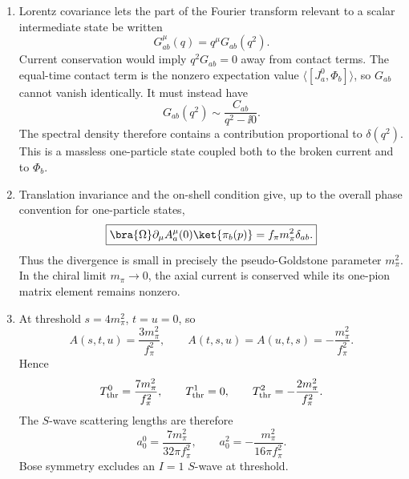\begin{enumerate}
  \begin{enumerate}
    \item[(a)]
    Lorentz covariance lets the part of the Fourier transform relevant to
    a scalar intermediate state be written
    \[
      G^\mu_{ab}(q)=q^\mu G_{ab}(q^2).
    \]
    Current conservation would imply \(q^2G_{ab}=0\) away from contact
    terms.  The equal-time contact term is the nonzero expectation value
    \(\langle[J^0_a,\Phi_b]\rangle\), so \(G_{ab}\) cannot vanish
    identically.  It must instead have
    \[
      G_{ab}(q^2)\sim\frac{C_{ab}}{q^2-\ii0}.
    \]
    The spectral density therefore contains a contribution proportional to
    \(\delta(q^2)\).  This is a massless one-particle state coupled both to
    the broken current and to \(\Phi_b\).
    \item[(b)]
    Translation invariance and the on-shell condition give, up to the
    overall phase convention for one-particle states,
    \[
      \boxed{
      \bra{\Omega}\partial_\mu A^\mu_a(0)\ket{\pi_b(p)}
        =f_\pi m_\pi^2\delta_{ab}.}
    \]
    Thus the divergence is small in precisely the pseudo-Goldstone
    parameter \(m_\pi^2\).  In the chiral limit \(m_\pi\to0\), the axial
    current is conserved while its one-pion matrix element remains
    nonzero.
    \item[(c)]
    At threshold \(s=4m_\pi^2\), \(t=u=0\), so
    \[
      A(s,t,u)=\frac{3m_\pi^2}{f_\pi^2},\qquad
      A(t,s,u)=A(u,t,s)=-\frac{m_\pi^2}{f_\pi^2}.
    \]
    Hence
    \[
      T^0_{\rm thr}=\frac{7m_\pi^2}{f_\pi^2},\qquad
      T^1_{\rm thr}=0,\qquad
      T^2_{\rm thr}=-\frac{2m_\pi^2}{f_\pi^2}.
    \]
    The \(S\)-wave scattering lengths are therefore
    \[
      \boxed{a_0^0=\frac{7m_\pi^2}{32\pi f_\pi^2},\qquad
        a_0^2=-\frac{m_\pi^2}{16\pi f_\pi^2}.}
    \]
    Bose symmetry excludes an \(I=1\) \(S\)-wave at threshold.
  \end{enumerate}


\end{enumerate}
